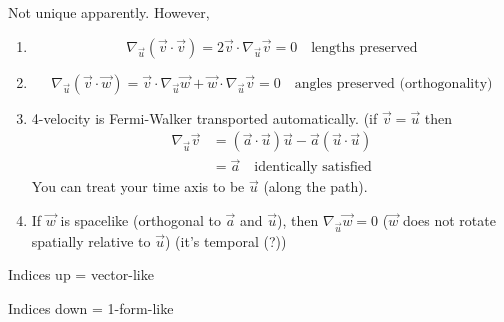\documentclass[a4paper]{article} %
\begin{document}
Not unique apparently. However,
\begin{enumerate}
\item 
\begin{equation}
\nabla_{\vec{u}}(\vec{v}\cdot\vec{v})=2\vec{v}\cdot\nabla_{\vec{u}}\vec{v}=0\quad\text{lengths preserved}
\end{equation}
\item 
\begin{equation}
\nabla_{\vec{u}}(\vec{v}\cdot\vec{w})=\vec{v}\cdot\nabla_{\vec{u}}\vec{w}+\vec{w}\cdot\nabla_{\vec{u}}\vec{v}=0
\quad\text{angles preserved (orthogonality)}
\end{equation}
\item
4-velocity is Fermi-Walker transported automatically. (if $\vec{v}=\vec{u}$ then
\begin{align}
\nabla_{\vec{u}}\vec{v}&=(\vec{a}\cdot\vec{u})\vec{u}-\vec{a}(\vec{u}\cdot\vec{u})\\
&=\vec{a}\quad\text{identically satisfied}
\end{align}
You can treat your time axis to be $\vec{u}$ (along the path).
\item
If $\vec{w}$ is spacelike (orthogonal to $\vec{a}$ and $\vec{u}$), then $\nabla_{\vec{u}}\vec{w}=0$ ($\vec{w}$ does not rotate spatially relative to $\vec{u}$) (it's temporal (?))
\end{enumerate}


\pagebreak



Indices up = vector-like

Indices down = 1-form-like

\end{document}
